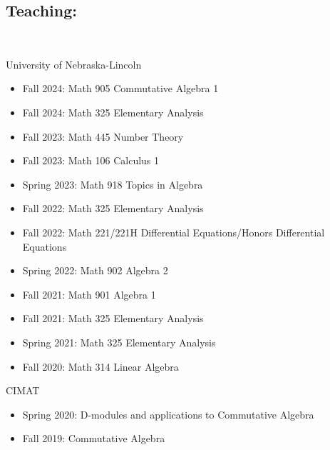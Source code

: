 \documentclass[12pt]{amsart}
\begin{document}
\subsection*{Teaching:}

\




\hspace{-5mm} University of Nebraska-Lincoln
\begin{itemize}[leftmargin=9mm]
\item Fall 2024: Math 905 Commutative Algebra 1
\item Fall 2024: Math 325 Elementary Analysis
	\item Fall 2023: Math 445 Number Theory
	\item Fall 2023: Math 106 Calculus 1
	\item Spring 2023: Math 918 Topics in Algebra
	\item Fall 2022: Math 325 Elementary Analysis
	\item Fall 2022: Math 221/221H Differential Equations/Honors Differential Equations
	\item Spring 2022: Math 902 Algebra 2
	\item Fall 2021: Math 901 Algebra 1
	\item Fall 2021: Math 325 Elementary Analysis
	\item Spring 2021: Math 325 Elementary Analysis
	\item Fall 2020: Math 314 Linear Algebra
\end{itemize}
	
	
	
\hspace{-5mm} CIMAT
\begin{itemize}	[leftmargin=9mm]
	\item Spring 2020: D-modules and applications to Commutative Algebra
	\item Fall 2019: Commutative Algebra
\end{itemize}
	
\end{document}
